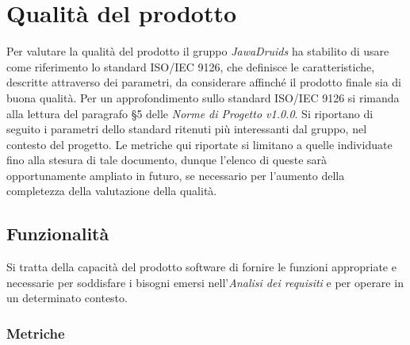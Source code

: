 \chapter{Qualità del prodotto} \label{QualitàDelProdotto}

Per valutare la qualità del prodotto il gruppo \textit{JawaDruids} ha stabilito di usare come riferimento lo standard ISO/IEC 9126, che definisce le caratteristiche, descritte attraverso dei parametri,  da considerare affinché il prodotto finale sia di buona qualità. 
Per un approfondimento sullo standard ISO/IEC 9126 si rimanda alla lettura del paragrafo §5 delle \textit{Norme di Progetto v1.0.0}. 
Si riportano di seguito i parametri dello standard ritenuti più interessanti dal gruppo, nel contesto del  progetto.
Le metriche qui riportate si limitano a quelle individuate fino alla stesura di tale documento, dunque l’elenco di queste sarà opportunamente ampliato in futuro, se necessario per l’aumento della completezza della valutazione della qualità.

\section{Funzionalità} \label{3.1}
Si tratta della capacità del prodotto software di fornire le funzioni appropriate e necessarie per soddisfare i bisogni emersi nell’\textit{Analisi dei requisiti} e per operare in un determinato contesto. 
\subsection{Metriche} \label{3.1.1}
